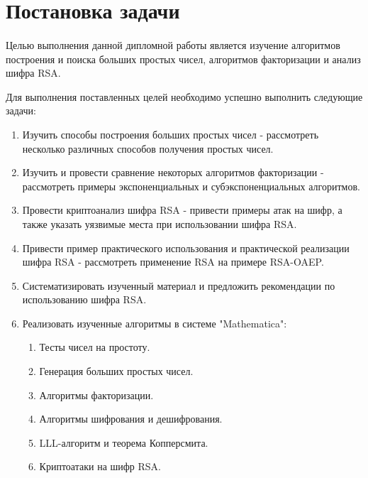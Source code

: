 \section*{Постановка задачи}

  \paragraph{} Целью выполнения данной дипломной работы является изучение алгоритмов построения и поиска больших простых чисел, алгоритмов факторизации и анализ 
  шифра RSA.

    Для выполнения поставленных целей необходимо успешно выполнить следующие задачи:

    \begin{enumerate}
      \item Изучить способы построения больших простых чисел - рассмотреть несколько различных способов получения простых чисел.
      \item Изучить и провести сравнение некоторых алгоритмов факторизации - рассмотреть примеры экспоненциальных и субэкспоненциальных алгоритмов.
      \item Провести криптоанализ шифра RSA - привести примеры атак на шифр, а также указать уязвимые места при использовании шифра RSA.
      \item Привести пример практического использования и практической реализации шифра RSA - рассмотреть применение RSA на примере RSA-OAEP.
      \item Систематизировать изученный материал и предложить рекомендации по использованию шифра RSA.
      \item Реализовать изученные алгоритмы в системе "Mathematica":
        \begin{enumerate}
          \item Тесты чисел на простоту.
          \item Генерация больших простых чисел.
          \item Алгоритмы факторизации.
          \item Алгоритмы шифрования и дешифрования.
          \item LLL-алгоритм и теорема Копперсмита.
          \item Криптоатаки на шифр RSA.
        \end{enumerate}
    \end{enumerate}